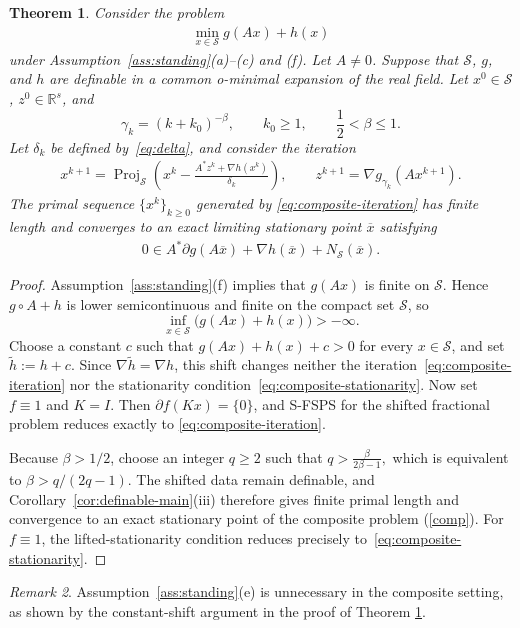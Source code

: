 \documentclass[9pt]{article}
\numberwithin{equation}{section}
\newtheorem{theorem}{Theorem}[section]
\theoremstyle{definition}
\theoremstyle{remark}
\newtheorem{remark}[theorem]{Remark}
\newcommand{\R}{\mathbb R}
\newcommand{\Sset}{\mathcal S}
\DeclareMathOperator{\proj}{Proj}
\begin{document}
\begin{theorem}
\label{cor:composite}
Consider the problem
\begin{eqnarray}\label{comp}
 \min_{x\in\Sset}g(Ax)+h(x)
\end{eqnarray}
under Assumption~\ref{ass:standing}(a)--(c) and (f).
Let $A\neq0$. Suppose that
$\Sset$, $g$, and $h$ are definable in a common o-minimal expansion
of the real field. Let $x^0\in\Sset$, $z^0\in\R^s$, and
\[
 \gamma_k=(k+k_0)^{-\beta},
 \qquad k_0\geq1,\qquad \frac12<\beta\leq1.
\]
Let $\delta_k$ be defined by~\eqref{eq:delta}, and consider the iteration
\begin{eqnarray}\label{eq:composite-iteration}
 x^{k+1}=\proj_{\Sset}\left(
 x^k-\frac{A^*z^k+\nabla h(x^k)}{\delta_k}\right),
 \qquad
 z^{k+1}=\nabla g_{\gamma_k}(Ax^{k+1}).
\end{eqnarray}
The primal sequence $\{x^k\}_{k\ge 0}$ generated by
\eqref{eq:composite-iteration} has finite length and converges to an exact limiting stationary point $\overline x$
satisfying
\begin{eqnarray}\label{eq:composite-stationarity}
 0\in A^*\partial g(A\overline x)
      +\nabla h(\overline x)+N_{\Sset}(\overline x).
\end{eqnarray}
\end{theorem}
\begin{proof}
Assumption~\ref{ass:standing}(f) implies that $g(Ax)$ is finite on
$\Sset$. Hence $g\circ A+h$ is lower semicontinuous and finite on the
compact set $\Sset$, so
\[
    \inf_{x\in\Sset}\bigl(g(Ax)+h(x)\bigr)>-\infty.
\]
Choose a constant $c$ such that
$g(Ax)+h(x)+c>0$ for every $x\in\Sset$, and set
$\widetilde h:=h+c$. Since $\nabla\widetilde h=\nabla h$, this
shift changes neither the iteration~\eqref{eq:composite-iteration}
nor the stationarity condition~\eqref{eq:composite-stationarity}.
Now set $f\equiv1$ and $K=I$. Then $\partial f(Kx)=\{0\}$, and
S-FSPS for the shifted fractional problem reduces exactly to
\eqref{eq:composite-iteration}.

Because $\beta>1/2$, choose an integer $q\geq2$ such that
$
 q>\frac{\beta}{2\beta-1},
$
which is equivalent to $\beta>q/(2q-1)$. The shifted data remain
definable, and Corollary~\ref{cor:definable-main}(iii) therefore gives
finite primal length and convergence to an
exact stationary point of the composite problem (\ref{comp}). For $f\equiv1$, the lifted-stationarity condition
reduces precisely to~\eqref{eq:composite-stationarity}.
\end{proof}
\begin{remark}
Assumption~\ref{ass:standing}(e)  is unnecessary in the composite setting, as shown by the constant-shift argument in the proof of Theorem \ref{cor:composite}.
\end{remark}
\end{document}
